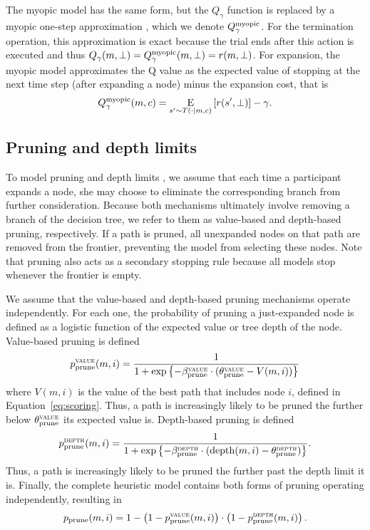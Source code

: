 The myopic model has the same form, but the $Q_\gamma$ function is replaced by a myopic one-step approximation \citep{russell1991principles}, which we denote $Q_\gamma^{\mathrm{myopic}}$. For the termination operation, this approximation is exact because the trial ends after this action is executed and thus $Q_\gamma(m, \bot) = Q_\gamma^{\mathrm{myopic}}(m, \bot) = r(m, \bot)$. For expansion, the myopic model approximates the Q value as the expected value of stopping at the next time step (after expanding a node) minus the expansion cost, that is
\begin{equation}
Q_\gamma^{\mathrm{myopic}}(m, c) = \operatorname*{E}_{s' \sim T(\cdot \mid m, c)}\left[ 
  r(s', \bot)
\right] - \gamma.
\end{equation}

\subsection{Pruning and depth limits}\label{sec:planning-pruning}
To model pruning \citep{huys2012bonsai,huys2015interplay} and depth limits \citep{keramati2016adaptive,snider2015prospective}, we assume that each time a participant expands a node, she may choose to eliminate the corresponding branch from further consideration. Because both mechanisms ultimately involve removing a branch of the decision tree, we refer to them as value-based and depth-based pruning, respectively. If a path is pruned, all unexpanded nodes on that path are removed from the frontier, preventing the model from selecting these nodes. Note that pruning also acts as a secondary stopping rule because all models stop whenever the frontier is empty. 

We assume that the value-based and depth-based pruning mechanisms operate independently. For each one, the probability of pruning a just-expanded node is defined as a logistic function of the expected value or tree depth of the node. Value-based pruning is defined
%
\begin{equation}
  p_{\mathrm{prune}}^{\textsc{value}}(m, i) = \frac{1}{1 + \exp\left\{
    -\beta_{\mathrm{prune}}^{\textsc{value}} \cdot (\theta_{\mathrm{prune}}^{\textsc{value}}- V(m, i))\right\}}  
\end{equation}
where $V(m, i)$ is the value of the best path that includes node $i$, defined in Equation~\ref{eq:scoring}. Thus, a path is increasingly likely to be pruned the further below $\theta_{\mathrm{prune}}^{\textsc{value}}$ its expected value is. Depth-based pruning is defined
%
\begin{equation}
   p_{\mathrm{prune}}^{\textsc{depth}}(m, i) = \frac{1}{1 + \exp\left\{
    -\beta_{\mathrm{prune}}^{\textsc{depth}} \cdot (\mathrm{depth}(m, i) - \theta_{\mathrm{prune}}^{\textsc{depth}})\right\}}.
\end{equation}
%
Thus, a path is increasingly likely to be pruned the further past the depth limit it is. Finally, the complete heuristic model contains both forms of pruning operating independently, resulting in
\begin{equation}\label{eq:pprune}
  p_{\mathrm{prune}}(m, i) = 1 - \left(1 - p_{\mathrm{prune}}^{\textsc{value}}(m, i)\right)
     \cdot \left(1 - p_{\mathrm{prune}}^{\textsc{depth}}(m, i)\right)
  .
\end{equation}

